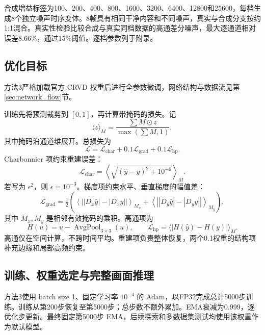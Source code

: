 \documentclass[11pt,a4paper,UTF8,fontset=fandol]{ctexart}
\begin{document}
合成增益标签为100、200、400、800、1600、3200、6400、12800和25600，每档生成8个独立噪声时序变体。8帧具有相同干净内容和不同噪声，真实与合成分支按约1:1混合。真实性检验比较合成与真实同档数据的高通差分噪声，最大逐通道相对误差8.66\%，通过15\%阈值。逐档参数列于附录。

\subsection{优化目标}

方法3严格加载官方 CRVD 权重后进行全参数微调，网络结构与数据流见第\ref{sec:network_flow}节。

训练先将预测裁剪到 $[0,1]$，再计算带掩码的损失。记
\begin{equation}
 \langle z\rangle_M=\frac{\sum M\odot z}{\max(\sum M,1)},
\end{equation}
其中掩码沿通道维展开。总损失为
\begin{equation}
 \mathcal L=\mathcal L_{\mathrm{char}}+0.1\mathcal L_{\mathrm{grad}}+0.1\mathcal L_{\mathrm{hp}}.
 \label{eq:loss}
\end{equation}
Charbonnier 项\cite{r13}约束重建误差：
\begin{equation}
 \mathcal L_{\mathrm{char}}=\left\langle\sqrt{(\hat y-y)^2+10^{-6}}\right\rangle_M.
\end{equation}
若写为 $\epsilon^2$，则 $\epsilon=10^{-3}$。梯度项约束水平、垂直梯度的幅值差：
\begin{equation}
 \mathcal L_{\mathrm{grad}}=\tfrac12\left(
 \left\langle\left||D_x\hat y|-|D_xy|\right|\right\rangle_{M_x}+
 \left\langle\left||D_y\hat y|-|D_yy|\right|\right\rangle_{M_y}\right),
\end{equation}
其中 $M_x,M_y$ 是相邻有效掩码的乘积。高通项为
\begin{equation}
 H(u)=u-\operatorname{AvgPool}_{3\times3}(u),\qquad
 \mathcal L_{\mathrm{hp}}=\langle|H(\hat y)-H(y)|\rangle_M.
\end{equation}
高通仅在空间计算，不跨时间平均。重建项负责整体恢复，两个0.1权重的结构项补充边缘和局部高频约束。

\subsection{训练、权重选定与完整画面推理}

方法3使用 batch size 1、固定学习率 $10^{-4}$ 的 Adam，以FP32完成总计5000步训练。训练从第200步恢复至第5000步；总步数不额外累加。EMA衰减为0.999，逐优化步更新。最终固定第5000步 EMA，后续探索和多数据集测试均使用该权重作为默认模型。
\end{document}
